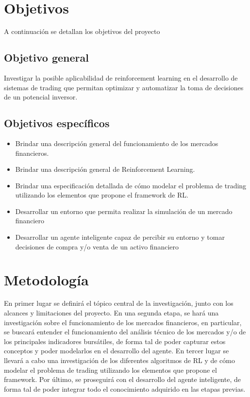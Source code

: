 \section{Objetivos}
A continuación se detallan los objetivos del proyecto

\subsection{Objetivo general}
Investigar la posible aplicabilidad de reinforcement learning en el desarrollo de sistemas de trading que permitan optimizar y automatizar la toma de decisiones de un potencial inversor.

\subsection{Objetivos específicos}

\begin{itemize} %
	
	\item Brindar una descripción general del funcionamiento de los mercados financieros.
	\item Brindar una descripción general de Reinforcement Learning.
	\item Brindar una especificación detallada de cómo modelar el problema de trading utilizando los elementos que propone el framework de RL.
	\item Desarrollar un entorno que permita realizar la simulación de un mercado financiero 
	\item Desarrollar un agente inteligente capaz de percibir su entorno y tomar decisiones de compra y/o venta de un activo financiero
\end{itemize}

\section{Metodología}
En primer lugar se definirá el tópico central de la investigación, junto con los alcances y limitaciones del proyecto.
En una segunda etapa, se hará una investigación sobre el funcionamiento de los mercados financieros, en particular, se buscará entender el funcionamiento del análisis técnico de los mercados  y/o de los principales indicadores bursátiles, de forma tal de poder capturar estos conceptos y poder modelarlos en el desarrollo del agente.  
En tercer lugar se llevará a cabo una investigación de los diferentes algoritmos de RL y de cómo modelar el problema de trading utilizando los elementos que propone el framework.
Por último, se proseguirá con el desarrollo del agente inteligente, de forma tal de poder integrar todo el conocimiento adquirido en las etapas previas. 

